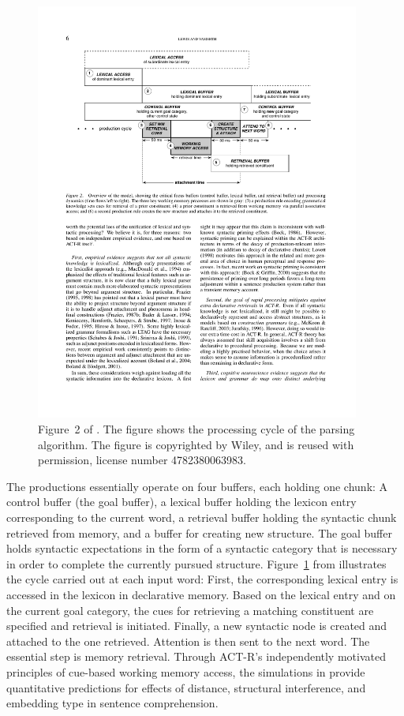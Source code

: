 \documentclass{cambridge7A}\usepackage[]{graphicx}\usepackage[]{color}
\begin{document}
\begin{figure}[htb]
	\centering
	\includegraphics[width=0.95\textwidth]{figures/lv05-fig2-buffers}
	\caption{Figure~2 of \cite{LewisVasishth2005}. The figure shows the processing cycle of the parsing algorithm. The figure is copyrighted by Wiley, and is reused with permission, license number 4782380063983.}
	\label{fig:lv05buffers}
\end{figure}

The productions essentially operate on four buffers, each holding one chunk: A control buffer (the goal buffer), a lexical buffer holding the lexicon entry corresponding to the current word, a retrieval buffer holding the syntactic chunk retrieved from memory, and a buffer for creating new structure. The goal buffer holds syntactic expectations in the form of a syntactic category that is necessary in order to complete the currently pursued structure.
Figure~\ref{fig:lv05buffers} from \cite{LewisVasishth2005} illustrates the cycle carried out at each input word: First, the corresponding lexical entry is accessed in the lexicon in  declarative memory. Based on the lexical entry and on the current goal category, the cues for retrieving a matching constituent are specified and retrieval is initiated. Finally, a new syntactic node is created and attached to the one retrieved. Attention is then sent to the next word. The essential step is memory retrieval. Through ACT-R's independently motivated principles of cue-based working memory access, the simulations in \cite{LewisVasishth2005} provide quantitative predictions for  effects of distance, structural interference, and embedding type in sentence comprehension.
\end{document}
